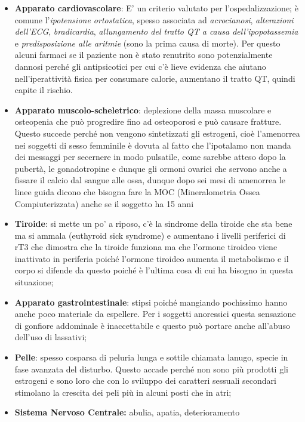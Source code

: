 \begin{itemize}
\item
  \textbf{Apparato cardiovascolare}: E' un criterio valutato per
  l'ospedalizzazione; è comune l'\emph{ipotensione ortostatica}, spesso
  associata ad \emph{acrocianosi}, \emph{alterazioni dell'ECG},
  \emph{bradicardia}, \emph{allungamento del tratto QT a causa
  dell'ipopotassemia} e \emph{predisposizione alle aritmie} (sono la
  prima causa di morte). Per questo alcuni farmaci se il paziente non è
  stato renutrito sono potenzialmente dannosi perché gli antipsicotici
  per cui c'è lieve evidenza che aiutano nell'iperattività fisica per
  consumare calorie, aumentano il tratto QT, quindi capite il rischio.
\item
  \textbf{Apparato muscolo-scheletrico}: deplezione della massa
  muscolare e osteopenia che può progredire fino ad osteoporosi e può
  causare fratture. Questo succede perché non vengono sintetizzati gli
  estrogeni, cioè l'amenorrea nei soggetti di sesso femminile è dovuta
  al fatto che l'ipotalamo non manda dei messaggi per secernere in modo
  pulsatile, come sarebbe atteso dopo la pubertà, le gonadotropine e
  dunque gli ormoni ovarici che servono anche a fissare il calcio dal
  sangue alle ossa, dunque dopo sei mesi di amenorrea le linee guida
  dicono che bisogna fare la MOC (Mineralometria Ossea Compiuterizzata)
  anche se il soggetto ha 15 anni
\item
  \textbf{Tiroide}: si mette un po' a riposo, c'è la sindrome della
  tiroide che sta bene ma si ammala (euthyroid sick syndrome) e
  aumentano i livelli periferici di rT3 che dimostra che la tiroide
  funziona ma che l'ormone tiroideo viene inattivato in periferia poiché
  l'ormone tiroideo aumenta il metabolismo e il corpo si difende da
  questo poiché è l'ultima cosa di cui ha bisogno in questa situazione;
\item
  \textbf{Apparato gastrointestinale}: stipsi poiché mangiando
  pochissimo hanno anche poco materiale da espellere. Per i soggetti
  anoressici questa sensazione di gonfiore addominale è inaccettabile e
  questo può portare anche all'abuso dell'uso di lassativi;
\item
  \textbf{Pelle}: spesso cosparsa di peluria lunga e sottile chiamata
  lanugo, specie in fase avanzata del disturbo. Questo accade perché non
  sono più prodotti gli estrogeni e sono loro che con lo sviluppo dei
  caratteri sessuali secondari stimolano la crescita dei peli più in
  alcuni posti che in atri;
\item
  \textbf{Sistema Nervoso Centrale:} abulia, apatia, deterioramento

\end{itemize}
